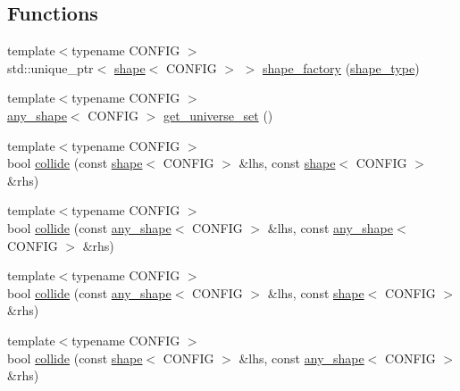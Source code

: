 \subsection*{Functions}
\begin{DoxyCompactItemize}
\item 
{\footnotesize template$<$typename C\+O\+N\+F\+IG $>$ }\\std\+::unique\+\_\+ptr$<$ \hyperlink{classmui_1_1geometry_1_1shape}{shape}$<$ C\+O\+N\+F\+IG $>$ $>$ \hyperlink{namespacemui_1_1geometry_a48a53be187267ec9912fafc182651a6e}{shape\+\_\+factory} (\hyperlink{namespacemui_1_1geometry_a5f311a343181e2f20482e5c9afb0f136}{shape\+\_\+type})
\item 
{\footnotesize template$<$typename C\+O\+N\+F\+IG $>$ }\\\hyperlink{classmui_1_1geometry_1_1any__shape}{any\+\_\+shape}$<$ C\+O\+N\+F\+IG $>$ \hyperlink{namespacemui_1_1geometry_a969b82522c35db6b6b89959cd74e4b6b}{get\+\_\+universe\+\_\+set} ()
\item 
{\footnotesize template$<$typename C\+O\+N\+F\+IG $>$ }\\bool \hyperlink{namespacemui_1_1geometry_a64dc85b99c0470026ea1e60d51acc086}{collide} (const \hyperlink{classmui_1_1geometry_1_1shape}{shape}$<$ C\+O\+N\+F\+IG $>$ \&lhs, const \hyperlink{classmui_1_1geometry_1_1shape}{shape}$<$ C\+O\+N\+F\+IG $>$ \&rhs)
\item 
{\footnotesize template$<$typename C\+O\+N\+F\+IG $>$ }\\bool \hyperlink{namespacemui_1_1geometry_a5614121d2669b49f90b25fc76c1b79bb}{collide} (const \hyperlink{classmui_1_1geometry_1_1any__shape}{any\+\_\+shape}$<$ C\+O\+N\+F\+IG $>$ \&lhs, const \hyperlink{classmui_1_1geometry_1_1any__shape}{any\+\_\+shape}$<$ C\+O\+N\+F\+IG $>$ \&rhs)
\item 
{\footnotesize template$<$typename C\+O\+N\+F\+IG $>$ }\\bool \hyperlink{namespacemui_1_1geometry_a29f122da511a72d3c5422bbf8268ccc1}{collide} (const \hyperlink{classmui_1_1geometry_1_1any__shape}{any\+\_\+shape}$<$ C\+O\+N\+F\+IG $>$ \&lhs, const \hyperlink{classmui_1_1geometry_1_1shape}{shape}$<$ C\+O\+N\+F\+IG $>$ \&rhs)
\item 
{\footnotesize template$<$typename C\+O\+N\+F\+IG $>$ }\\bool \hyperlink{namespacemui_1_1geometry_a13954d0260c8be6a2326ada37c60ac36}{collide} (const \hyperlink{classmui_1_1geometry_1_1shape}{shape}$<$ C\+O\+N\+F\+IG $>$ \&lhs, const \hyperlink{classmui_1_1geometry_1_1any__shape}{any\+\_\+shape}$<$ C\+O\+N\+F\+IG $>$ \&rhs)

\end{DoxyCompactItemize}
